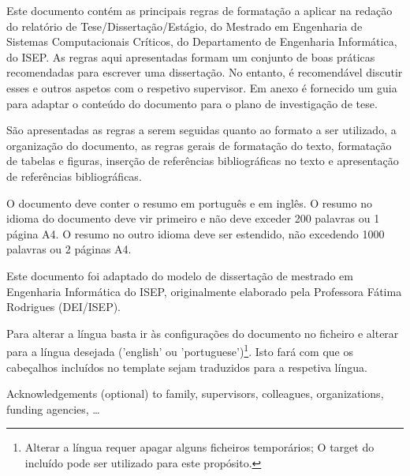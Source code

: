 \begin{abstractotherlanguage}

Este documento contém as principais regras de formatação a aplicar na redação do relatório de Tese/Dissertação/Estágio, do Mestrado em Engenharia de Sistemas Computacionais Críticos, do Departamento de Engenharia Informática, do ISEP. As regras aqui apresentadas formam um conjunto de boas práticas recomendadas para escrever uma dissertação. No entanto, é recomendável discutir esses e outros aspetos com o respetivo supervisor. Em anexo é fornecido um guia para adaptar o conteúdo do documento para o plano de investigação de tese.

São apresentadas as regras a serem seguidas quanto ao formato a ser utilizado, a organização do documento, as regras gerais de formatação do texto, formatação de tabelas e figuras, inserção de referências bibliográficas no texto e apresentação de referências bibliográficas.

O documento deve conter o resumo em português e em inglês. O resumo no idioma do documento deve vir primeiro e não deve exceder 200 palavras ou 1 página A4. O resumo no outro idioma deve ser estendido, não excedendo 1000 palavras ou 2 páginas A4.

Este documento foi adaptado do modelo de dissertação de mestrado em Engenharia Informática do ISEP, originalmente elaborado pela Professora Fátima Rodrigues (DEI/ISEP).

Para alterar a língua basta ir às configurações do documento no ficheiro  e alterar para a língua desejada ('english' ou 'portuguese')\footnote{Alterar a língua requer apagar alguns ficheiros temporários; O target  do  incluído pode ser utilizado para este propósito.}. Isto fará com que os cabeçalhos incluídos no template sejam traduzidos para a respetiva língua.

\end{abstractotherlanguage}


\begin{acknowledgements}

Acknowledgements (optional) to family, supervisors, colleagues, organizations, funding agencies, …

\end{acknowledgements}

